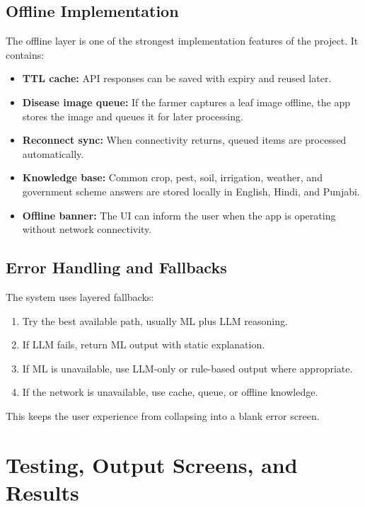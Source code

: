\documentclass[12pt,a4paper]{report}
\begin{document}
\section{Offline Implementation}

The offline layer is one of the strongest implementation features of the project. It contains:

\begin{itemize}[leftmargin=1.5em]
  \item \textbf{TTL cache:} API responses can be saved with expiry and reused later.
  \item \textbf{Disease image queue:} If the farmer captures a leaf image offline, the app stores the image and queues it for later processing.
  \item \textbf{Reconnect sync:} When connectivity returns, queued items are processed automatically.
  \item \textbf{Knowledge base:} Common crop, pest, soil, irrigation, weather, and government scheme answers are stored locally in English, Hindi, and Punjabi.
  \item \textbf{Offline banner:} The UI can inform the user when the app is operating without network connectivity.
\end{itemize}

\section{Error Handling and Fallbacks}

The system uses layered fallbacks:

\begin{enumerate}[leftmargin=1.5em]
  \item Try the best available path, usually ML plus LLM reasoning.
  \item If LLM fails, return ML output with static explanation.
  \item If ML is unavailable, use LLM-only or rule-based output where appropriate.
  \item If the network is unavailable, use cache, queue, or offline knowledge.
\end{enumerate}

This keeps the user experience from collapsing into a blank error screen.

\singlespacing

\chapter{Testing, Output Screens, and Results}
\doublespacing
\end{document}
